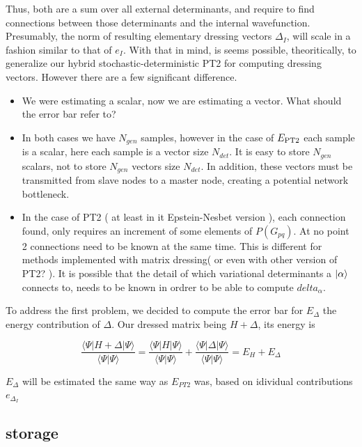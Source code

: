 \documentclass[./thesis.tex]{subfiles}
\begin{document}
Thus, both are a sum over all external determinants, and require to find connections between those determinants and the internal wavefunction. Presumably, the norm of resulting elementary dressing vectors $\Delta_I$, will scale in a fashion similar to that of $e_I$.
With that in mind, is seems possible, theoritically, to generalize our hybrid stochastic-deterministic PT2 for computing dressing vectors.
However there are a few significant difference.
\begin{itemize}
\item
We were estimating a scalar, now we are estimating a vector. What should the error bar refer to?
\item
In both cases we have $N_{gen}$ samples, however in the case of $E_\text{PT2}$ each sample is a scalar, here each sample is a vector size $N_{det}$. It is easy to store $N_{gen}$ scalars, not to store $N_{gen}$ vectors size $N_{det}$. In addition, these vectors must be transmitted from slave nodes to a master node, creating a potential network bottleneck.
\item
In the case of PT2 ( at least in it Epstein-Nesbet version ), each connection found, only requires an increment of some elements of $P(G_{pq})$. At no point 2 connections need to be known at the same time. This is different for methods implemented with matrix dressing( or even with other version of PT2? ). It is possible that the detail of which variational determinants a $\ket \alpha$ connects to, needs to be known in ordrer to be able to compute $delta_\alpha$.
\end{itemize}

To address the first problem, we decided to compute the error bar for $E_{\Delta}$ the energy contribution of $\Delta$. Our dressed matrix being $H + \Delta$, its energy is
    
\begin{equation}
\frac{\langle \Psi |H + \Delta | \Psi\rangle}{\langle \Psi | \Psi \rangle} = \frac{\langle \Psi |H  | \Psi\rangle}{\langle \Psi | \Psi \rangle} + \frac{\langle \Psi |\Delta | \Psi\rangle}{\langle \Psi | \Psi \rangle} = E_H + E_{\Delta} 
\end{equation}


$E_{\Delta}$ will be estimated the same way as $E_{PT2}$ was, based on idividual contributions $e_{\Delta_I}$

\subsection{storage}
\end{document}

